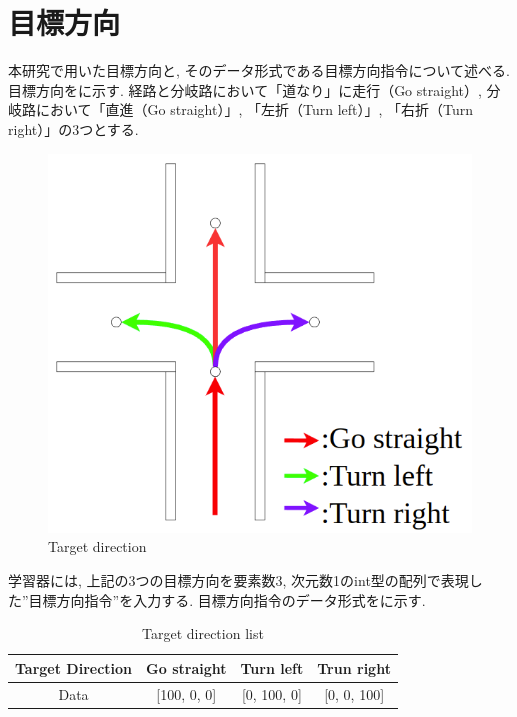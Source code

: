 
\section{目標方向}
本研究で用いた目標方向と, そのデータ形式である目標方向指令について述べる. 目標方向をに示す. 経路と分岐路において「道なり」に走行（Go straight）, 分岐路において「直進（Go straight）」, 「左折（Turn left）」, 「右折（Turn right）」の3つとする.

\begin{figure}[hbtp]
  \centering
 \includegraphics[keepaspectratio, scale=0.45]
      {images/direction.png}
 \caption{Target direction}
 \label{Fig:direction}
\end{figure}

学習器には, 上記の3つの目標方向を要素数3, 次元数1のint型の配列で表現した”目標方向指令”を入力する. 目標方向指令のデータ形式をに示す.

\begin{table}[hbtp]
  \caption{Target direction list}
  \label{table:direction}
  \centering
  \begin{tabular}{|c|c|c|c|}
    \hline
    Target Direction  & Go straight & Turn left & Trun right\\
    \hline
    Data & [100, 0, 0] & [0, 100, 0] & [0, 0, 100]\\
    \hline
  \end{tabular}
\end{table}


\newpage
